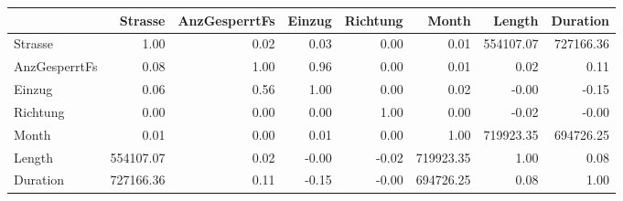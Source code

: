 \begin{tabular}{lrrrrrrr}
\toprule
{} &   Strasse &  AnzGesperrtFs &  Einzug &  Richtung &     Month &    Length &  Duration \\
\midrule
Strasse       &      1.00 &           0.02 &    0.03 &      0.00 &      0.01 & 554107.07 & 727166.36 \\
AnzGesperrtFs &      0.08 &           1.00 &    0.96 &      0.00 &      0.01 &      0.02 &      0.11 \\
Einzug        &      0.06 &           0.56 &    1.00 &      0.00 &      0.02 &     -0.00 &     -0.15 \\
Richtung      &      0.00 &           0.00 &    0.00 &      1.00 &      0.00 &     -0.02 &     -0.00 \\
Month         &      0.01 &           0.00 &    0.01 &      0.00 &      1.00 & 719923.35 & 694726.25 \\
Length        & 554107.07 &           0.02 &   -0.00 &     -0.02 & 719923.35 &      1.00 &      0.08 \\
Duration      & 727166.36 &           0.11 &   -0.15 &     -0.00 & 694726.25 &      0.08 &      1.00 \\
\bottomrule
\end{tabular}
